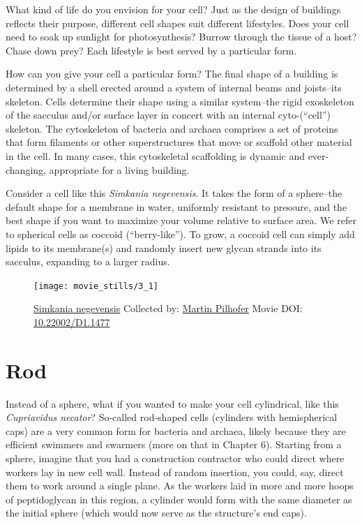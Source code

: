 \documentclass[]{tufte-book}
\begin{document}
What kind of life do you envision for your cell? Just as the design of
buildings reflects their purpose, different cell shapes suit different
lifestyles. Does your cell need to soak up sunlight for photosynthesis?
Burrow through the tissue of a host? Chase down prey? Each lifestyle is
best served by a particular form.

How can you give your cell a particular form? The final shape of a
building is determined by a shell erected around a system of internal
beams and joists--its skeleton. Cells determine their shape using a
similar system--the rigid exoskeleton of the sacculus and/or surface
layer in concert with an internal cyto-(``cell'') skeleton. The
cytoskeleton of bacteria and archaea comprises a set of proteins that
form filaments or other superstructures that move or scaffold other
material in the cell. In many cases, this cytoskeletal scaffolding is
dynamic and ever-changing, appropriate for a living building.

Consider a cell like this \emph{Simkania negevensis}. It takes the form
of a sphere--the default shape for a membrane in water, uniformly
resistant to pressure, and the best shape if you want to maximize your
volume relative to surface area. We refer to spherical cells as coccoid
(``berry-like''). To grow, a coccoid cell can simply add lipids to its
membrane(s) and randomly insert new glycan strands into its sacculus,
expanding to a larger radius.





\begin{figure}
\texttt{[image: movie\_stills/3\_1]} \caption[\protect\hyperlink{tree}{Simkania negevensis} Collected by:
\protect\hyperlink{martin_pilhofer}{Martin Pilhofer} Movie DOI:
\href{https://doi.org/10.22002/D1.1477}{10.22002/D1.1477}]{\protect\hyperlink{tree}{Simkania negevensis} Collected by:
\protect\hyperlink{martin_pilhofer}{Martin Pilhofer} Movie DOI:
\href{https://doi.org/10.22002/D1.1477}{10.22002/D1.1477}}\label{fig:3-1}
\end{figure}

\section{Rod}\label{rod}

Instead of a sphere, what if you wanted to make your cell cylindrical,
like this \emph{Cupriavidus necator}? So-called rod-shaped cells
(cylinders with hemispherical caps) are a very common form for bacteria
and archaea, likely because they are efficient swimmers and swarmers
(more on that in Chapter 6). Starting from a sphere, imagine that you
had a construction contractor who could direct where workers lay in new
cell wall. Instead of random insertion, you could, say, direct them to
work around a single plane. As the workers laid in more and more hoops
of peptidoglycan in this region, a cylinder would form with the same
diameter as the initial sphere (which would now serve as the structure's
end caps).
\end{document}
